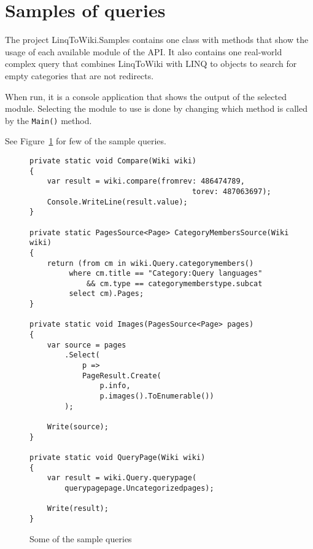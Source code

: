 \section{Samples of queries}

The project LinqToWiki.Samples contains one class with methods
that show the usage of each available module of the \ac{API}.
It also contains one real-world complex query that combines LinqToWiki with LINQ to objects
to search for empty categories that are not redirects.

When run, it is a console application that shows the output of the selected module.
Selecting the module to use is done by changing which method is called by the \lstinline{Main()} method.

See Figure~\ref{query-samples} for few of the sample queries.

\begin{figure}[htbp]

\begin{lstlisting}
private static void Compare(Wiki wiki)
{
	var result = wiki.compare(fromrev: 486474789,
                                     torev: 487063697);
	Console.WriteLine(result.value);
}

private static PagesSource<Page> CategoryMembersSource(Wiki wiki)
{
	return (from cm in wiki.Query.categorymembers()
		 where cm.title == "Category:Query languages"
		     && cm.type == categorymemberstype.subcat
		 select cm).Pages;
}

private static void Images(PagesSource<Page> pages)
{
	var source = pages
		.Select(
			p =>
			PageResult.Create(
				p.info,
				p.images().ToEnumerable())
		);

	Write(source);
}

private static void QueryPage(Wiki wiki)
{
	var result = wiki.Query.querypage(
		querypagepage.Uncategorizedpages);

	Write(result);
}        
\end{lstlisting}

\caption{Some of the sample queries}
\label{query-samples}
\end{figure}